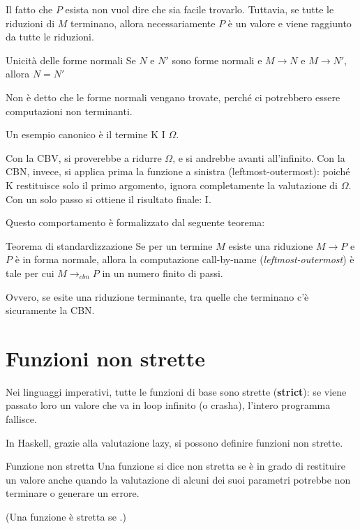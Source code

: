 Il fatto che $P$ esista non vuol dire che sia facile trovarlo. Tuttavia, se tutte le riduzioni di $M$ terminano, allora necessariamente $P$ è un valore e viene raggiunto da tutte le riduzioni.

\begin{corframe}{Unicità delle forme normali}{}
    Se $N$ e $N'$ sono forme normali e $M \to N$ e $M \to N'$, allora $N = N'$
\end{corframe}

Non è detto che le forme normali vengano trovate, perché ci potrebbero essere computazioni non terminanti.

Un esempio canonico è il termine K I $\Omega$. 

Con la CBV, si proverebbe a ridurre $\Omega$, e si andrebbe avanti all'infinito. Con la CBN, invece, si applica prima la funzione a sinistra (leftmost-outermost): poiché K restituisce solo il primo argomento, ignora completamente la valutazione di $\Omega$. Con un solo passo si ottiene il risultato finale: I.

Questo comportamento è formalizzato dal seguente teorema:
\begin{thmframe}{Teorema di standardizzazione}{}
    Se per un termine $M$ esiste una riduzione $M \to P$ e $P$ è in forma normale, allora la computazione call-by-name (\textit{leftmost-outermost}) è tale per cui $M \to_{cbn} P$ in un numero finito di passi.
\end{thmframe}

Ovvero, se esite una riduzione terminante, tra quelle che terminano c'è sicuramente la CBN.

\section{Funzioni non strette}
Nei linguaggi imperativi, tutte le funzioni di base sono strette (\textbf{strict}): se viene passato loro un valore che va in loop infinito (o crasha), l'intero programma fallisce.

In Haskell, grazie alla valutazione lazy, si possono definire funzioni non strette.

\begin{defframe}{Funzione non stretta}{}
    Una funzione si dice non stretta se è in grado di restituire un valore anche quando la valutazione di alcuni dei suoi parametri potrebbe non terminare o generare un errore.

    (Una funzione è stretta se .)
\end{defframe}

